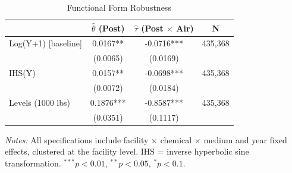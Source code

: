 \begin{table}[htbp]
\centering
\caption{Functional Form Robustness}
\label{tab:funcform}
\begin{tabular}{lccc}
\toprule
& $\hat{\theta}$ (Post) & $\hat{\tau}$ (Post $\times$ Air) & N \\
\midrule
Log(Y+1) [baseline] & 0.0167** & -0.0716*** & 435,368 \\
& (0.0065) & (0.0169) & \\[3pt]
IHS(Y) & 0.0157** & -0.0698*** & 435,368 \\
& (0.0072) & (0.0184) & \\[3pt]
Levels (1000 lbs) & 0.1876*** & -0.8587*** & 435,368 \\
& (0.0351) & (0.1117) & \\
\bottomrule
\end{tabular}
\begin{minipage}{0.95\textwidth}
\vspace{0.3em}
\footnotesize \textit{Notes:} All specifications include facility $\times$ chemical $\times$ medium and year fixed effects, clustered at the facility level. IHS = inverse hyperbolic sine transformation. $^{***}p<0.01$, $^{**}p<0.05$, $^{*}p<0.1$.
\end{minipage}
\end{table}
